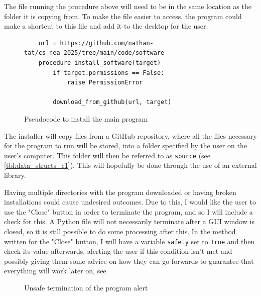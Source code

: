 \documentclass[11pt]{article}
\begin{document}
                The file running the procedure above will need to be in the same location as the folder it is copying from. To make the file easier to access, the program could make a shortcut to this file and add it to the desktop for the user.
                

                \begin{figure}[!ht]
                    \begin{verbatim}
    url = https://github.com/nathan-tat/cs_nea_2025/tree/main/code/software
    procedure install_software(target)
        if target.permissions == False:
            raise PermissionError
        
        download_from_github(url, target)
                    \end{verbatim}
                    \caption{Pseudocode to install the main program}
                    \label{pc:install_software_ps_c1}
                \end{figure}


                The installer will copy files from a GitHub repository, where all the files necessary for the program to run will be stored, into a folder specified by the user on the user's computer. This folder will then be referred to as \verb|source| (see \autoref{tbl:data_structs_c1}). This will hopefully be done through the use of an external library.

                Having multiple directories with the program downloaded or having broken installations could cause undesired outcomes. Due to this, I would like the user to use the "Close" button in order to terminate the program, and so I will include a check for this. A Python file will not necessarily terminate after a GUI window is closed, so it is still possible to do some processing after this. In the method written for the "Close" button, I will have a variable \verb|safety| set to \verb|True| and then check its value afterwards, alerting the user if this condition isn't met and possibly giving them some advice on how they can go forwards to guarantee that everything will work later on, see 

                \begin{figure}[!ht]
                    \centering
                    \caption{Unsafe termination of the program alert}
                    \label{fig:installer_ui_design_unsafe_exit_c1}
                \end{figure}
\end{document}
